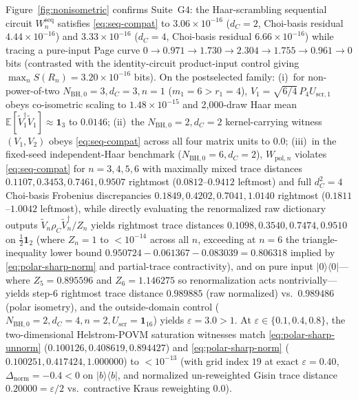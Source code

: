\documentclass[11pt,a4paper]{article}
\theoremstyle{definition}
\theoremstyle{remark}
\newcommand{\1}{\mathbf{1}}
\begin{document}
Figure~\ref{fig:nonisometric} confirms Suite~G4: the Haar-scrambling sequential circuit $W_n^{\mathrm{seq}}$ satisfies \eqref{eq:seq-compat} to $3.06\times 10^{-16}$ ($d_C=2$, Choi-basis residual $4.44\times 10^{-16}$) and $3.33\times 10^{-16}$ ($d_C=4$, Choi-basis residual $6.66\times 10^{-16}$) while tracing a pure-input Page curve $0\to 0.971\to 1.730\to 2.304\to 1.755\to 0.961\to 0$ bits (contrasted with the identity-circuit product-input control giving $\max_n S(R_n)=3.20\times 10^{-16}$ bits). On the postselected family: (i)~for non-power-of-two $N_{\mathrm{BH},0}=3,d_C=3,n=1$ ($m_1=6>r_1=4$), $V_1=\sqrt{6/4}\,P_4 U_{\mathrm{scr},1}$ obeys co-isometric scaling to $1.48\times 10^{-15}$ and 2{,}000-draw Haar mean $\mathbb{E}[\tilde{V}_1^\dagger\tilde{V}_1]\approx\1_3$ to $0.0146$; (ii)~the $N_{\mathrm{BH},0}=2,d_C=2$ kernel-carrying witness $(V_1,V_2)$ obeys \eqref{eq:seq-compat} across all four matrix units to $0.0$; (iii)~in the fixed-seed independent-Haar benchmark ($N_{\mathrm{BH},0}=6,d_C=2$), $W_{\mathrm{pol},n}$ violates \eqref{eq:seq-compat} for $n=3,4,5,6$ with maximally mixed trace distances $0.1107, 0.3453, 0.7461, 0.9507$ rightmost ($0.0812$–$0.9412$ leftmost) and full $d_C^2=4$ Choi-basis Frobenius discrepancies $0.1849, 0.4202, 0.7041, 1.0140$ rightmost ($0.1811$–$1.0042$ leftmost), while directly evaluating the renormalized raw dictionary outputs $\tilde{V}_n\rho_C\tilde{V}_n^\dagger/Z_n$ yields rightmost trace distances $0.1098, 0.3540, 0.7474, 0.9510$ on $\frac{1}{2}\1_2$ (where $Z_n=1$ to $<10^{-14}$ across all $n$, exceeding at $n=6$ the triangle-inequality lower bound $0.950724 - 0.061367 - 0.083039 = 0.806318$ implied by \eqref{eq:polar-sharp-norm} and partial-trace contractivity), and on pure input $|0\rangle\langle 0|$---where $Z_5=0.895596$ and $Z_6=1.146275$ so renormalization acts nontrivially---yields step-$6$ rightmost trace distance $0.989885$ (raw normalized) vs.\ $0.989486$ (polar isometry), and the outside-domain control ($N_{\mathrm{BH},0}=2,d_C=4,n=2,U_{\mathrm{scr}}=\1_{16}$) yields $\varepsilon=3.0>1$. At $\varepsilon\in\{0.1, 0.4, 0.8\}$, the two-dimensional Helstrom-POVM saturation witnesses match \eqref{eq:polar-sharp-unnorm} ($0.100126, 0.408619, 0.894427$) and \eqref{eq:polar-sharp-norm} ($0.100251, 0.417424, 1.000000$) to $<10^{-13}$ (with grid index $19$ at exact $\varepsilon=0.40$, $\Delta_{\mathrm{norm}}=-0.4<0$ on $|b\rangle\langle b|$, and normalized un-reweighted Gisin trace distance $0.20000=\varepsilon/2$ vs.\ contractive Kraus reweighting $0.0$).

\end{document}
